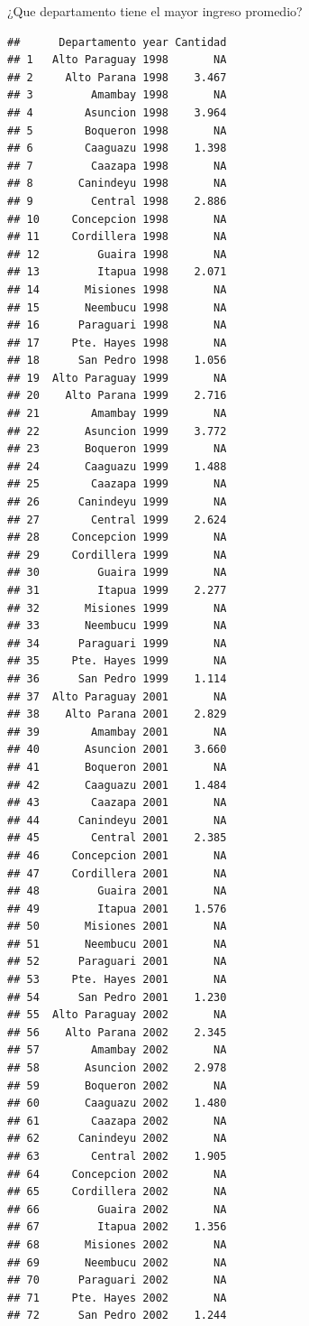 \documentclass[
  ignorenonframetext,
]{beamer}
\begin{document}
\begin{frame}[fragile]{¿Que departamento tiene el mayor ingreso
promedio?}
\begin{verbatim}
##      Departamento year Cantidad
## 1   Alto Paraguay 1998       NA
## 2     Alto Parana 1998    3.467
## 3         Amambay 1998       NA
## 4        Asuncion 1998    3.964
## 5        Boqueron 1998       NA
## 6        Caaguazu 1998    1.398
## 7         Caazapa 1998       NA
## 8       Canindeyu 1998       NA
## 9         Central 1998    2.886
## 10     Concepcion 1998       NA
## 11     Cordillera 1998       NA
## 12         Guaira 1998       NA
## 13         Itapua 1998    2.071
## 14       Misiones 1998       NA
## 15       Neembucu 1998       NA
## 16      Paraguari 1998       NA
## 17     Pte. Hayes 1998       NA
## 18      San Pedro 1998    1.056
## 19  Alto Paraguay 1999       NA
## 20    Alto Parana 1999    2.716
## 21        Amambay 1999       NA
## 22       Asuncion 1999    3.772
## 23       Boqueron 1999       NA
## 24       Caaguazu 1999    1.488
## 25        Caazapa 1999       NA
## 26      Canindeyu 1999       NA
## 27        Central 1999    2.624
## 28     Concepcion 1999       NA
## 29     Cordillera 1999       NA
## 30         Guaira 1999       NA
## 31         Itapua 1999    2.277
## 32       Misiones 1999       NA
## 33       Neembucu 1999       NA
## 34      Paraguari 1999       NA
## 35     Pte. Hayes 1999       NA
## 36      San Pedro 1999    1.114
## 37  Alto Paraguay 2001       NA
## 38    Alto Parana 2001    2.829
## 39        Amambay 2001       NA
## 40       Asuncion 2001    3.660
## 41       Boqueron 2001       NA
## 42       Caaguazu 2001    1.484
## 43        Caazapa 2001       NA
## 44      Canindeyu 2001       NA
## 45        Central 2001    2.385
## 46     Concepcion 2001       NA
## 47     Cordillera 2001       NA
## 48         Guaira 2001       NA
## 49         Itapua 2001    1.576
## 50       Misiones 2001       NA
## 51       Neembucu 2001       NA
## 52      Paraguari 2001       NA
## 53     Pte. Hayes 2001       NA
## 54      San Pedro 2001    1.230
## 55  Alto Paraguay 2002       NA
## 56    Alto Parana 2002    2.345
## 57        Amambay 2002       NA
## 58       Asuncion 2002    2.978
## 59       Boqueron 2002       NA
## 60       Caaguazu 2002    1.480
## 61        Caazapa 2002       NA
## 62      Canindeyu 2002       NA
## 63        Central 2002    1.905
## 64     Concepcion 2002       NA
## 65     Cordillera 2002       NA
## 66         Guaira 2002       NA
## 67         Itapua 2002    1.356
## 68       Misiones 2002       NA
## 69       Neembucu 2002       NA
## 70      Paraguari 2002       NA
## 71     Pte. Hayes 2002       NA
## 72      San Pedro 2002    1.244

\end{verbatim}
\end{frame}
\end{document}
